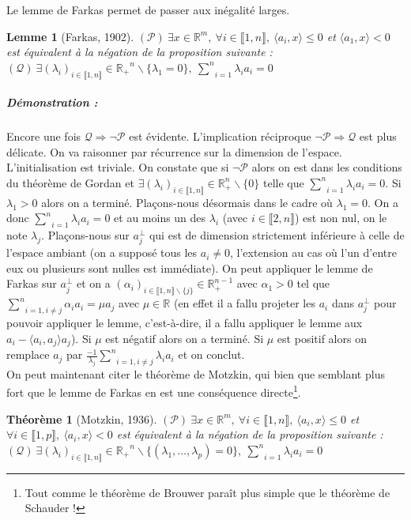 \documentclass[10pt,a4paper]{article}
\newtheorem{thm}{Théorème}
\newtheorem{lemma}{Lemme}
\begin{document}
Le lemme de Farkas permet de passer aux inégalité larges.
\begin{lemma}[Farkas, 1902]
  $(\mathcal{P}) \  \exists x \in \mathbb{R}^m, \ \forall i \in \llbracket 1,n \rrbracket, \ \langle a_i,x \rangle \le 0$ et $\langle a_1,x \rangle < 0$ est équivalent à la négation de la proposition suivante : $ (\mathcal{Q}) \ \exists (\lambda_i)_{i \in \llbracket 1,n \rrbracket}\in \mathbb{R_+}^n \backslash\lbrace \lambda_1=0\rbrace, \ \underset{i=1}{\overset{n}{\sum}} \lambda_i a_i=0$
\end{lemma}
\subparagraph{Démonstration :} Encore une fois $\mathcal{Q} \Rightarrow \neg \mathcal{P}$ est évidente.
L'implication réciproque $\neg \mathcal{P} \Rightarrow \mathcal{Q}$ est plus délicate.
On va raisonner par récurrence sur la dimension de l'espace.
L'initialisation est triviale.
On constate que si $\neg \mathcal{P}$ alors on est dans les conditions du théorème de Gordan et $\exists (\lambda_i)_{i \in \llbracket 1, n\rrbracket} \in \mathbb{R}_+^n \backslash \lbrace 0 \rbrace$ telle que $\underset{i=1}{\overset{n}{\sum}} \lambda_i a_i=0$.
Si  $\lambda_1 >0$ alors on a terminé.
Plaçons-nous désormais dans le cadre où $\lambda_1=0$.
On a donc $\underset{i=1}{\overset{n}{\sum}} \lambda_i a_i=0$ et au moins un des $\lambda_i$ (avec $i \in \llbracket 2,n \rrbracket$) est non nul, on le note $\lambda_j$.
Plaçons-nous sur $a_j^{\perp}$ qui est de dimension strictement inférieure à celle de l'espace ambiant (on a supposé tous les $a_i \neq 0$, l'extension au cas où l'un d'entre eux ou plusieurs sont nulles est immédiate).
On peut appliquer le lemme de Farkas sur $a_j^{\perp}$ et on a $(\alpha_i)_{i \in \llbracket 1,n \rrbracket \backslash \lbrace j \rbrace} \in \mathbb{R}_+^{n-1}$ avec $\alpha_1>0$ tel que $\underset{i=1, i \neq j}{\overset{n}{\sum}}\alpha_i a_i= \mu a_j$ avec $\mu \in \mathbb{R}$ (en effet il a fallu projeter les $a_i$ dans $a_j^{\perp}$ pour pouvoir appliquer le lemme, c'est-à-dire, il a fallu appliquer le lemme aux $a_i-\langle a_i,a_j \rangle a_j$).
Si $\mu$ est négatif alors on a terminé.
Si $\mu$ est positif alors on remplace $a_j$ par $\frac{-1}{\lambda_j}\underset{i=1, i \neq j}{\overset{n}{\sum}}\lambda_i a_i$ et on conclut.
\\

On peut maintenant citer le théorème de Motzkin, qui bien que semblant plus fort que le lemme de Farkas en est une conséquence directe\footnote{Tout comme le théorème de Brouwer paraît plus simple que le théorème de Schauder !}.

\begin{thm}[Motzkin, 1936]
  $(\mathcal{P}) \  \exists x \in \mathbb{R}^m, \ \forall i \in \llbracket 1,n \rrbracket, \ \langle a_i,x \rangle \le 0$ et $\forall i \in \llbracket 1,p \rrbracket, \ \langle a_i,x \rangle < 0$
  est équivalent à la négation de la proposition suivante :
  $ (\mathcal{Q}) \ \exists (\lambda_i)_{i \in \llbracket 1,n \rrbracket}\in \mathbb{R_+}^n \backslash\lbrace (\lambda_1,\dots,\lambda_p)=0\rbrace, \ \underset{i=1}{\overset{n}{\sum}} \lambda_i a_i=0$
\end{thm}
\end{document}
